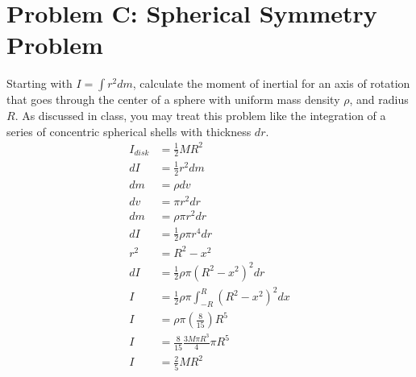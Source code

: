 \documentclass{article}
\begin{document}
\section{Problem C: Spherical Symmetry Problem}

Starting with $ I = \int r^2dm $, calculate the moment of inertial for an axis of rotation that goes through the center of a sphere with uniform mass density $ \rho $, and radius $ R $. As discussed in class, you may treat this problem like the integration of a series of concentric spherical shells with thickness $ dr $.
\begin{align*}
	I_{disk} & = \frac{1}{2}MR^2 \\
	dI & = \frac{1}{2}r^2 dm \\
	dm & = \rho dv \\
	dv & = \pi r^2 dr \\
	dm & = \rho \pi r^2 dr \\
	dI & = \frac{1}{2} \rho \pi r^4 dr \\
	r^2 & = R^2 - x^2 \\
	dI & = \frac{1}{2} \rho \pi (R^2 - x^2)^2 dr \\
	I & = \frac{1}{2} \rho \pi \int_{-R}^{R} (R^2 - x^2)^2 dx \\
	I & = \rho \pi \left( \frac{8}{15} \right) R^5 \\
	I & = \frac{8}{15} \frac{3M\pi R^3}{4} \pi R^5 \\
	I & = \frac{2}{5}MR^2
\end{align*}
\end{document}
